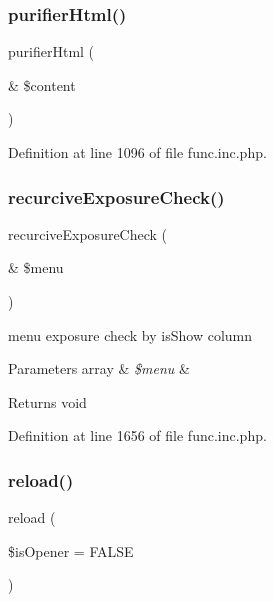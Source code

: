 \subsubsection{\texorpdfstring{purifier\+Html()}{purifierHtml()}}
{\footnotesize\ttfamily purifier\+Html (\begin{DoxyParamCaption}\item[{\&}]{\$content }\end{DoxyParamCaption})}



Definition at line 1096 of file func.\+inc.\+php.

\mbox{\label{func_8inc_8php_a229b3ea7ca966e907d266bc60efa353b}} 
\subsubsection{\texorpdfstring{recurcive\+Exposure\+Check()}{recurciveExposureCheck()}}
{\footnotesize\ttfamily recurcive\+Exposure\+Check (\begin{DoxyParamCaption}\item[{\&}]{\$menu }\end{DoxyParamCaption})}

menu exposure check by is\+Show column 
\begin{DoxyParams}[1]{Parameters}
array & {\em \$menu} & \\
\hline
\end{DoxyParams}
\begin{DoxyReturn}{Returns}
void 
\end{DoxyReturn}


Definition at line 1656 of file func.\+inc.\+php.

\mbox{\label{func_8inc_8php_aaf78eccbde1406d602a7c408a364be24}} 
\subsubsection{\texorpdfstring{reload()}{reload()}}
{\footnotesize\ttfamily reload (\begin{DoxyParamCaption}\item[{}]{\$is\+Opener = {\ttfamily FALSE} }\end{DoxyParamCaption})}

